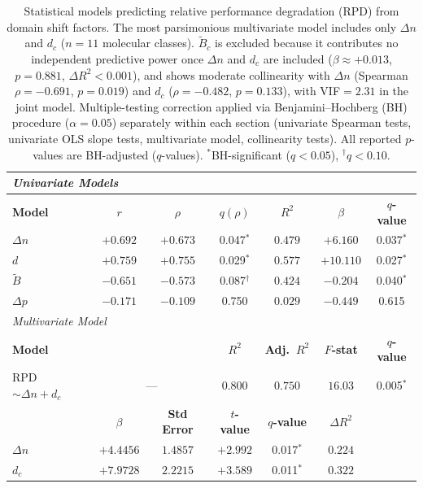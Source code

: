 \begin{table}[h!]
\centering
\caption{Statistical models predicting relative performance degradation (RPD) from domain shift factors. The most parsimonious multivariate model includes only $\Delta n$ and $d_c$ ($n=11$ molecular classes). $\tilde{B}_c$ is excluded because it contributes no independent predictive power once $\Delta n$ and $d_c$ are included ($\beta\approx+0.013$, $p=0.881$, $\Delta R^2<0.001$), and shows moderate collinearity with $\Delta n$ (Spearman $\rho=-0.691$, $p=0.019$) and $d_c$ ($\rho=-0.482$, $p=0.133$), with VIF$=2.31$ in the joint model. Multiple-testing correction applied via Benjamini--Hochberg (BH) procedure ($\alpha=0.05$) separately within each section (univariate Spearman tests, univariate OLS slope tests, multivariate model, collinearity tests). All reported $p$-values are BH-adjusted ($q$-values). $^{*}$BH-significant ($q<0.05$), $^{\dagger}q<0.10$.}
\label{tab:regression-models}
\small
\begin{tabular}{lcccccc}
\toprule\toprule
\multicolumn{7}{l}{\textit{Univariate Models}} \\
\midrule
\textbf{Model} & \textbf{$r$} & \textbf{$\rho$} & \textbf{$q(\rho)$} & \textbf{$R^2$} & \textbf{$\beta$} & \textbf{$q$-value} \\
\midrule
    $\Delta n$ & $+0.692$ & $+0.673$ & 0.047$^{*}$ & $0.479$ & $+6.160$ & 0.037$^{*}$ \\
    $d$ & $+0.759$ & $+0.755$ & 0.029$^{*}$ & $0.577$ & $+10.110$ & 0.027$^{*}$ \\
    $\tilde{B}$ & $-0.651$ & $-0.573$ & 0.087$^{\dagger}$ & $0.424$ & $-0.204$ & 0.040$^{*}$ \\
    $\Delta p$ & $-0.171$ & $-0.109$ & 0.750 & $0.029$ & $-0.449$ & 0.615 \\
\midrule\midrule
\multicolumn{7}{l}{\textit{Multivariate Model}} \\
\midrule
\textbf{Model} & \multicolumn{2}{c}{} & \textbf{$R^2$} & \textbf{Adj.\ $R^2$} & \textbf{$F$-stat} & \textbf{$q$-value} \\
\midrule
    RPD $\sim \Delta n + d_c$ & \multicolumn{2}{c}{---} & $0.800$ & $0.750$ & $16.03$ & 0.005$^{*}$ \\
\midrule
 & \textbf{$\beta$} & \textbf{Std Error} & \textbf{$t$-value} & \textbf{$q$-value} & \textbf{$\Delta R^2$} & \multicolumn{1}{l}{} \\
\midrule
    $\Delta n$ & $+4.4456$ & $1.4857$ & $+2.992$ & 0.017$^{*}$ & $0.224$ \\
    $d_c$ & $+7.9728$ & $2.2215$ & $+3.589$ & 0.011$^{*}$ & $0.322$ \\

\end{tabular}
\end{table}
